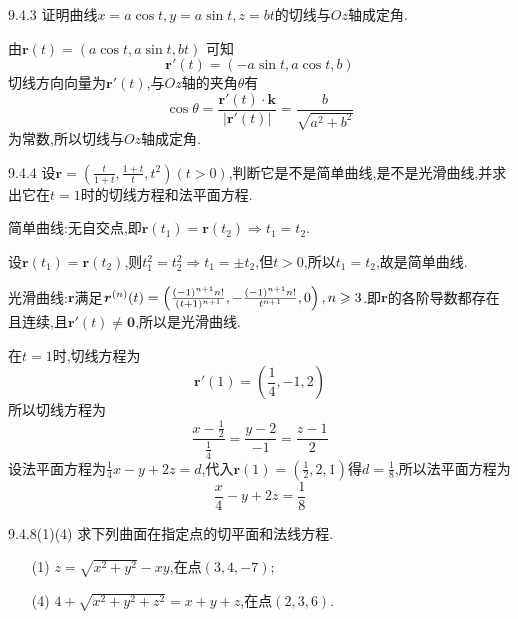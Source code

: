 \begin{exercise}{9.4.3}
证明曲线$x = a \cos t, y = a \sin t, z = bt$的切线与$Oz$轴成定角.
\end{exercise}

\begin{solution}
    由$\bm r(t) = (a \cos t, a \sin t, bt)$
    可知$$\bm r'(t) = (-a \sin t, a \cos t, b)$$
    切线方向向量为$\bm r'(t)$,与$Oz$轴的夹角$\theta$有
    $$\cos \theta = \frac{\bm r'(t) \cdot \bm k}{|\bm r'(t)|} = \frac{b}{\sqrt{a^2+b^2}}$$为常数,所以切线与$Oz$轴成定角.
\end{solution}

\begin{exercise}{9.4.4}
设$\bm r = \left( \frac{t}{1+t},\frac{1+t}{t},t^2 \right) (t > 0 )$,判断它是不是简单曲线,是不是光滑曲线,并求出它在$t = 1$时的切线方程和法平面方程.

\begin{solution}
    简单曲线:无自交点,即$\bm r(t_1) = \bm r(t_2) \Rightarrow t_1 = t_2$.

    设$\bm r(t_1) = \bm r(t_2)$,则$t_1^2 = t_2^2 \Rightarrow t_1 = \pm t_2$,但$t > 0$,所以$t_1 = t_2$,故是简单曲线.

    光滑曲线:$\bm r$满足$\bm r^{(n)}(t) = \left( \frac{(-1)^{n+1} n!}{(t+1)^{n+1}}, - \frac{(-1)^{n+1}n!}{t^{n+1}},0 \right),n \geqslant 3$.即$\bm r$的各阶导数都存在且连续,且$\bm r'(t) \neq \bm 0$,所以是光滑曲线.

    在$t = 1$时,切线方程为
    $$\bm r'(1) = \left( \frac{1}{4}, -1, 2 \right)$$
    所以切线方程为
    $$\frac{x-\frac12}{\frac14} = \frac{y-2}{-1} = \frac{z-1}{2}$$
    设法平面方程为$\frac{1}{4}x - y + 2z = d$,代入$\bm r(1) = \left( \frac12, 2, 1 \right)$得$d = \frac{1}{8}$,所以法平面方程为
    $$\frac{x}{4} - y + 2z = \frac18$$
\end{solution}
\end{exercise}

\begin{exercise}{9.4.8(1)(4)}
求下列曲面在指定点的切平面和法线方程.
\begin{enumerate}
    \item[(1)] $z = \sqrt{x^2+y^2} - xy$,在点$(3,4,-7)$;
    \item[(4)] $4 + \sqrt{x^2+y^2+z^2} = x+y+z$,在点$(2,3,6)$.
\end{enumerate}
\end{exercise}

